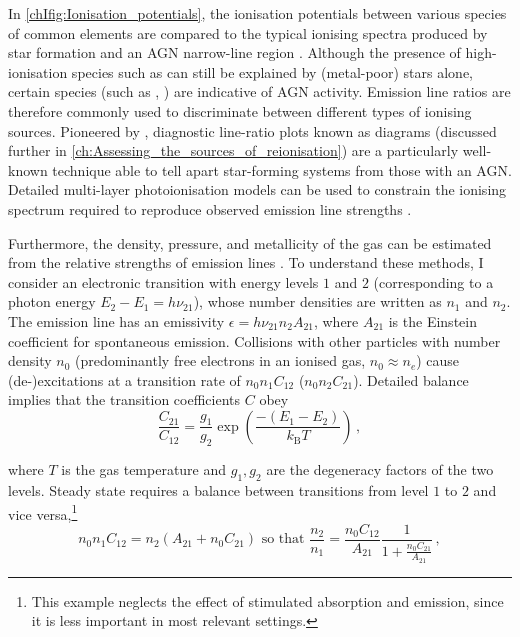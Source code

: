 In \cref{chIfig:Ionisation_potentials}, the ionisation potentials between various species of common elements are compared to the typical ionising spectra produced by star formation and an AGN narrow-line region \citep{2016MNRAS.456.3354F}. Although the presence of high-ionisation species such as  can still be explained by (metal-poor) stars alone, certain species (such as , ) are indicative of AGN activity. Emission line ratios are therefore commonly used to discriminate between different types of ionising sources. Pioneered by \citet*[;  hereafter]{1981PASP...93....5B}, diagnostic line-ratio plots known as  diagrams (discussed further in \cref{ch:Assessing_the_sources_of_reionisation}) are a particularly well-known technique able to tell apart star-forming systems from those with an AGN. Detailed multi-layer photoionisation models can be used to constrain the ionising spectrum required to reproduce observed emission line strengths \citep[e.g.][]{2021ApJ...922..170B}.

Furthermore, the density, pressure, and metallicity of the gas can be estimated from the relative strengths of emission lines \citep{2017PASP..129h2001P, 2019ARA&A..57..511K}. To understand these methods, I consider an electronic transition with energy levels $1$ and $2$ (corresponding to a photon energy $E_2 - E_1 = h \nu_{21}$), whose number densities are written as $n_1$ and $n_2$. The emission line has an emissivity $\epsilon = h \nu_{21} n_2 A_{21}$, where $A_{21}$ is the Einstein coefficient for spontaneous emission. Collisions with other particles with number density $n_0$ (predominantly free electrons in an ionised gas, $n_0 \approx n_e$) cause (de-)excitations at a transition rate of $n_0 n_1 C_{12}$ ($n_0 n_2 C_{21}$). Detailed balance implies that the transition coefficients $C$ obey
\begin{equation}
    \label{chIeq:Collisional_excitation_rates}
    \frac{C_{21}}{C_{12}} = \frac{g_1}{g_2} \exp \left( \frac{- \left( E_1 - E_2 \right)}{k_\text{B} T} \right) \, ,
\end{equation}

\noindent where $T$ is the gas temperature and $g_1, g_2$ are the degeneracy factors of the two levels. Steady state requires a balance between transitions from level $1$ to $2$ and vice versa,\footnote{This example neglects the effect of stimulated absorption and emission, since it is less important in most relevant settings.}
\begin{equation}
    \label{chIeq:Collisional_excitation_equilibrium}
    n_0 n_1 C_{12} = n_2 \left( A_{21} + n_0 C_{21} \right) \text{ so that } \frac{n_2}{n_1} = \frac{n_0 C_{12}}{A_{21}} \frac{1}{1 + \frac{n_0 C_{21}}{A_{21}}} \, ,
\end{equation}


